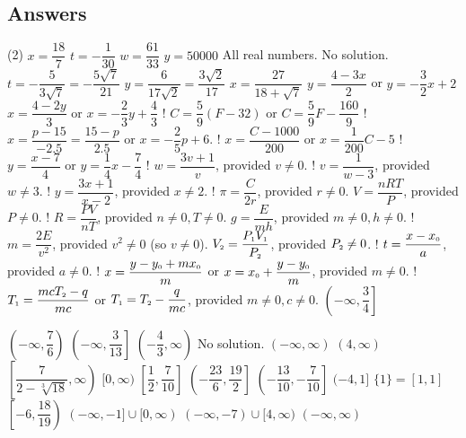 \clearpage

\subsection{Answers}

\begin{tasks}(2)
\task $x = \dfrac{18}{7}$
\task $t = -\dfrac{1}{30}$
\task $w = \dfrac{61}{33}$
\task  $y = 50000$
\task  All real numbers.
\task  No solution.
\task  $t = -\dfrac{5}{3\sqrt{7}} = -\dfrac{5\sqrt{7}}{21}$
\task  $y = \dfrac{6}{17\sqrt{2}}  = \dfrac{3 \sqrt{2}}{17}$
\task  $x = \dfrac{27}{18+\sqrt{7}}$
\task  $y = \dfrac{4 - 3x}{2}$ or $y = -\dfrac{3}{2}x + 2$
\task  $x = \dfrac{4 - 2y}{3}$ or $x = -\dfrac{2}{3} y + \dfrac{4}{3}$
\task!  $C = \dfrac{5}{9}(F - 32)$ or  $C = \dfrac{5}{9} F - \dfrac{160}{9}$
\task!  $x = \dfrac{p - 15}{-2.5} = \dfrac{15-p}{2.5}$ or $x = -\dfrac{2}{5} p + 6$.
\task!  $x = \dfrac{C - 1000}{200}$ or $x = \dfrac{1}{200} C - 5$
\task!  $y = \dfrac{x-7}{4}$ or $y = \dfrac{1}{4} x - \dfrac{7}{4}$
\task!  $w = \dfrac{3v+1}{v}$, provided $v \neq 0$.
\task!  $v = \dfrac{1}{w-3}$, provided $w \neq 3$.
\task! $y = \dfrac{3x+1}{x-2}$, provided $x \neq 2$.
\task! $\pi = \dfrac{C}{2r}$, provided $r \neq 0$.
\task $V = \dfrac{nRT}{P}$, provided $P \neq 0$.
\task! $R = \dfrac{PV}{nT}$, provided $n \neq 0, T \neq 0$.
\task $g = \dfrac{E}{mh}$, provided $m \neq 0, h \neq 0$.
\task! $m = \dfrac{2E}{v^2}$, provided $v^2 \neq 0$ (so $v \neq 0$).
\task $V_{\text{\tiny $2$}} = \dfrac{P_{\text{\tiny $1$}}V_{\text{\tiny $1$}}}{P_{\text{\tiny $2$}}}$, provided $P_{\text{\tiny $2$}} \neq 0$. 
\task! $t = \dfrac{x - x_{\text{\tiny $0$}}}{a}$, provided $a \neq 0$.
\task! $x = \dfrac{y-y_{\text{\tiny $0$}} + mx_{\text{\tiny $0$}}}{m}$ or $x = x_{\text{\tiny $0$}} + \dfrac{y-y_{\text{\tiny $0$}}}{m}$, provided $m \neq 0$. 
\task! $T_{\text{\tiny $1$}} = \dfrac{mcT_{\text{\tiny $2$}} - q}{mc}$ or $T_{\text{\tiny $1$}} = T_{\text{\tiny $2$}} - \dfrac{q}{mc} $, provided $m \neq 0, c \neq 0$.  
\task $\left(-\infty, \dfrac{3}{4}\right]$
\addtocounter{task}{1}
\task $\left(-\infty, \dfrac{7}{6} \right)$  
\task  $\left( -\infty,  \dfrac{3}{13}\right]$
\task $\left(-\dfrac{4}{3}, \infty\right)$
\task No solution.
\task $(-\infty, \infty)$
\task $(4, \infty)$\vphantom{$\left[ \dfrac{7}{2 - \sqrt[3]{18}}, \infty\right)$
}
\task  $\left[ \dfrac{7}{2 - \sqrt[3]{18}}, \infty\right)$
\task   $[0, \infty)$\vphantom{$\left[ \dfrac{7}{2 - \sqrt[3]{18}}, \infty\right)$
}
\task $\left[ \dfrac{1}{2}, \dfrac{7}{10}\right]$
\task $\left(-\dfrac{23}{6}, \dfrac{19}{2} \right]$
\task $\left(-\dfrac{13}{10}, -\dfrac{7}{10} \right]$
\task  $(-4,1]$\vphantom{$\left[-6, \dfrac{18}{19} \right)$}
\task  $\{1 \} = [1,1]$ \vphantom{$\left[-6, \dfrac{18}{19} \right)$}
\task  $\left[-6, \dfrac{18}{19} \right)$
\task  $(-\infty, -1] \cup [0, \infty)$ 
\task   $(-\infty, -7) \cup [4, \infty)$
\task   $(-\infty, \infty)$
\end{tasks}
